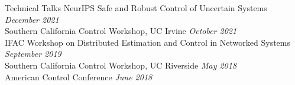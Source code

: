 \begin{rSection}{Technical Talks}
{NeurIPS Safe and Robust Control of Uncertain Systems} \hfill {\em December 2021}\\
{Southern California Control Workshop, UC Irvine} \hfill {\em October 2021}\\
{IFAC Workshop on Distributed Estimation and Control in Networked Systems} \hfill {\em September 2019}\\
{Southern California Control Workshop, UC Riverside} \hfill {\em May 2018}\\
{American Control Conference} \hfill {\em June 2018}
\end{rSection}